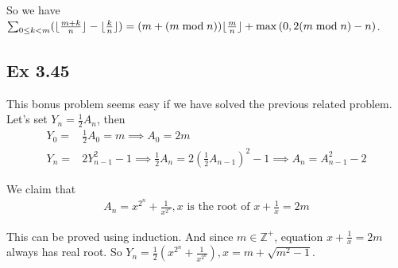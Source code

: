 \documentclass{article}
\begin{document}
So we have$\sum_{0\le k < m}(\lfloor \frac{m+k}{n} \rfloor - \lfloor \frac{k}{n} \rfloor) = (m + (m \bmod n))\lfloor \frac{m}{n} \rfloor + \max{(0, 2(m \bmod n)-n)}$.

\subsection{Ex 3.45}
This bonus problem seems easy if we have solved the previous related problem. Let's set $Y_n=\frac{1}{2}A_n$, then
\begin{equation}
    \begin{split}
        Y_0 = & \frac{1}{2}A_0 = m \implies A_0 = 2m\\
        Y_n = & 2Y_{n-1}^2 - 1 \implies \frac{1}{2}A_n = 2(\frac{1}{2}A_{n-1})^2 - 1 \implies A_n = A_{n-1}^2 - 2
    \end{split}
\end{equation}

We claim that
\begin{equation}
    \begin{split}
        A_n = x^{2^n} + \frac{1}{x^{2^n}}, x \text{ is the root of } x + \frac{1}{x} = 2m
    \end{split}
\end{equation}

This can be proved using induction. And since $m\in \mathbb{Z}^+$, equation $x+\frac{1}{x}=2m$ always has real root. So $Y_n=\frac{1}{2}(x^{2^n} + \frac{1}{x^{2^n}}), x = m+\sqrt{m^2-1}$.
\end{document}
